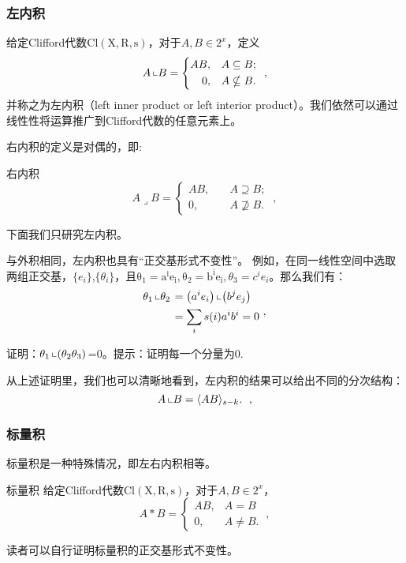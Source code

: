 \subsubsection{左内积}
\begin{definition}{}
给定Clifford代数$\mathrm {Cl(X,R,s)}$，对于$A,B\in 2^x$，定义
\begin{equation}
A\left\llcorner B=\left\{\begin{aligned}
A B,\quad & A \subseteq B ; \\
0,\quad & A \nsubseteq B .
\end{aligned}\right.\right.~,
\end{equation}
并称之为左内积（left inner product or left interior product）。我们依然可以通过线性性将运算推广到Clifford代数的任意元素上。
\end{definition}
右内积的定义是对偶的，即:
\begin{definition}{右内积}
\begin{equation}
A\lrcorner B=\left\{\begin{aligned}
A B,\quad & A \supseteq B ; \\
0,\quad & A \nsupseteq B .
\end{aligned}\right.~,
\end{equation}
\end{definition}
下面我们只研究左内积。

与外积相同，左内积也具有“正交基形式不变性”。
例如，在同一线性空间中选取两组正交基，$\{e_i\}$,$\{\theta _i\}$，且$\mathrm {\theta_1=a^i e_i,\theta_2=b^i e_i},\theta_3=c^i e_i$。那么我们有：
\begin{equation}
\begin{aligned}
\theta_1\left\llcorner\theta_2\right. & =\left(a^i e_i\right)\left\llcorner\left(b^j e_j\right)\right. \\
& =\sum_i s(i) a^i b^i=0
\end{aligned}~,
\end{equation}
\begin{exercise}{}
证明：$\theta_1\left\llcorner(\theta_2\theta_3)\right.$=0。提示：证明每一个分量为0.
\end{exercise}
从上述证明里，我们也可以清晰地看到，左内积的结果可以给出不同的分次结构：
\begin{equation}
A\left\llcorner B=\langle A B\rangle_{s-k} .\right.~,
\end{equation}

\subsubsection{标量积}
标量积是一种特殊情况，即左右内积相等。
\begin{definition}{标量积}
给定Clifford代数$\mathrm {Cl(X,R,s)}$，对于$A,B\in 2^x$，
\begin{equation}
A * B=\left\{\begin{array}{cc}
A B, & A=B \\
0, & A \neq B .
\end{array}\right.~,
\end{equation}
\end{definition}
读者可以自行证明标量积的正交基形式不变性。

